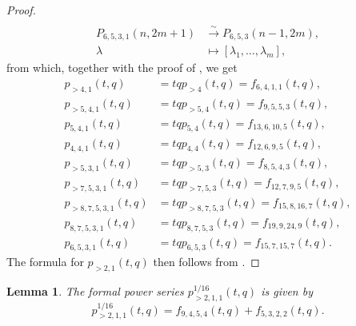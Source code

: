 \documentclass[a4paper, 12pt, reqno]{amsart}
\newtheorem{lemma}[theorem]{Lemma}
\theoremstyle{remark}
\numberwithin{equation}{subsection}
\begin{document}
\begin{proof}
\begin{align*}
  \end{align*}
  \begin{align*}
    P_{6, 5, 3, 1}(n, 2m + 1) &\xrightarrow{\sim} P_{6, 5, 3}(n - 1, 2m), \\
    \lambda &\mapsto [\lambda_1, \dots, \lambda_m],
  \end{align*}
  from which, together with the proof of , we get
  \begin{align*}
    p_{>4, 1}(t, q) &= tqp_{>4}(t, q) = f_{6, 4, 1, 1}(t, q), \\
    p_{>5, 4, 1}(t, q) &= tqp_{>5, 4}(t, q) = f_{9, 5, 5, 3}(t, q), \\
    p_{5, 4, 1}(t, q) &= tqp_{5, 4}(t, q) = f_{13, 6, 10, 5}(t, q), \\
    p_{4, 4, 1}(t, q) &= tqp_{4, 4}(t, q) = f_{12, 6, 9, 5}(t, q), \\
    p_{>5, 3, 1}(t, q) &= tqp_{>5, 3}(t, q) = f_{8, 5, 4, 3}(t, q), \\
    p_{>7, 5, 3, 1}(t, q) &= tqp_{>7, 5, 3}(t, q) = f_{12, 7, 9, 5}(t, q), \\
    p_{>8, 7, 5, 3, 1}(t, q) &= tqp_{>8, 7, 5, 3}(t, q) = f_{15, 8, 16, 7}(t, q), \\
    p_{8, 7, 5, 3, 1}(t, q) &= tqp_{8, 7, 5, 3}(t, q) = f_{19, 9, 24, 9}(t, q), \\
    p_{6, 5, 3, 1}(t, q) &= tqp_{6, 5, 3}(t, q) = f_{15, 7, 15, 7}(t, q).
  \end{align*}
  The formula for $p_{>2, 1}(t, q)$ then follows from .
\end{proof}

\begin{lemma}
  \label{lmm:33}
  The formal power series $p^{1/16}_{>2, 1, 1}(t, q)$ is given by
  \begin{equation*}
    p^{1/16}_{>2, 1, 1}(t, q) = f_{9, 4, 5, 4}(t, q) + f_{5, 3, 2, 2}(t, q).
  \end{equation*}
\end{lemma}
\end{document}
